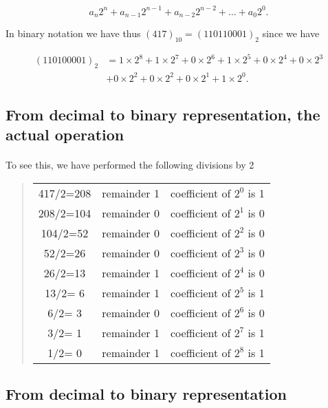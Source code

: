 \documentclass[%
oneside,                 %
final,                   %
10pt]{article}
\begin{document}
\[
  a_n2^n+a_{n-1}2^{n-1}  +a_{n-2}2^{n-2}  +\dots +a_{0}2^{0}.
\]

In binary notation we have thus $(417)_{10} =(110110001)_2$
since we have

\begin{align*}
(110100001)_2
&=1\times2^8+1\times 2^{7}+0\times 2^{6}+1\times 2^{5}+0\times 2^{4}+0\times 2^{3}\\
&+0\times 2^{2}+0\times 2^{2}+0\times 2^{1}+1\times 2^{0}.
\end{align*}



\subsection*{From decimal to binary representation, the actual operation}

\paragraph{}
To see this, we have performed the following divisions by 2


\begin{quote}
\begin{tabular}{ccc}
\hline
 \\
\hline
417/2=208 & remainder 1 & coefficient of $2^{0}$ is 1 \\
208/2=104 & remainder 0 & coefficient of $2^{1}$ is 0 \\
104/2=52  & remainder 0 & coefficient of $2^{2}$ is 0 \\
52/2=26   & remainder 0 & coefficient of $2^{3}$ is 0 \\
26/2=13   & remainder 1 & coefficient of $2^{4}$ is 0 \\
13/2= 6   & remainder 1 & coefficient of $2^{5}$ is 1 \\
6/2= 3    & remainder 0 & coefficient of $2^{6}$ is 0 \\
3/2= 1    & remainder 1 & coefficient of $2^{7}$ is 1 \\
1/2= 0    & remainder 1 & coefficient of $2^{8}$ is 1 \\
\hline
\end{tabular}
\end{quote}

\noindent



\subsection*{From decimal to binary representation}
\end{document}
